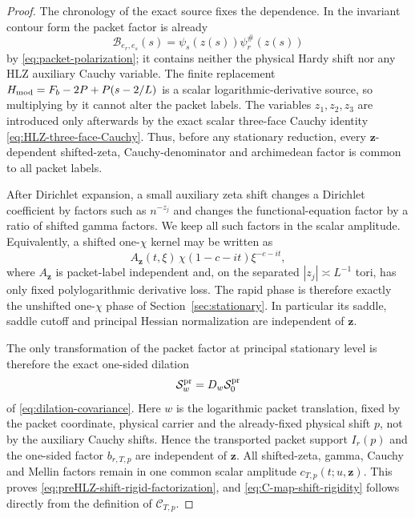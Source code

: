\begin{proof}
The chronology of the exact source fixes the dependence.  In the invariant
contour form the packet factor is already
\[
\mathcal B_{e_r,e_s}(s)=\psi_s(z(s))\psi_r^\#(z(s))
\]
by \eqref{eq:packet-polarization}; it contains neither the physical Hardy shift
nor any HLZ auxiliary Cauchy variable.  The finite replacement
$H_{\rm mod}=F_b-2P+P(s-2/L)$ is a scalar logarithmic-derivative source, so
multiplying by it cannot alter the packet labels.  The variables
$z_1,z_2,z_3$ are introduced only afterwards by the exact scalar three-face
Cauchy identity \eqref{eq:HLZ-three-face-Cauchy}.  Thus, before any stationary
reduction, every $\mathbf z$-dependent shifted-zeta, Cauchy-denominator and
archimedean factor is common to all packet labels.

After Dirichlet expansion, a small auxiliary zeta shift changes a Dirichlet
coefficient by factors such as $n^{-z_j}$ and changes the functional-equation
factor by a ratio of shifted gamma factors.  We keep all such factors in the
scalar amplitude.  Equivalently, a shifted one-$\chi$ kernel may be written as
\[
A_{\mathbf z}(t,\xi)\,
\chi(1-c-it)\xi^{-c-it},
\]
where $A_{\mathbf z}$ is packet-label independent and, on the separated
$|z_j|\asymp L^{-1}$ tori, has only fixed polylogarithmic derivative loss.  The
rapid phase is therefore exactly the unshifted one-$\chi$ phase of
Section~\ref{sec:stationary}.  In particular its saddle, saddle cutoff and
principal Hessian normalization are independent of $\mathbf z$.

The only transformation of the packet factor at principal stationary level is
therefore the exact one-sided dilation
\[
\mathcal S_w^{\rm pr}=D_w\mathcal S_0^{\rm pr}
\]
of \eqref{eq:dilation-covariance}.  Here $w$ is the logarithmic packet translation, fixed by the packet coordinate,
physical carrier and the already-fixed physical shift $p$, not by the auxiliary
Cauchy shifts.  Hence the transported packet support $I_r(p)$ and the one-sided
factor $b_{r,T,p}$ are independent of $\mathbf z$.  All shifted-zeta, gamma,
Cauchy and Mellin factors remain in one common scalar amplitude
$c_{T,p}(t;u,\mathbf z)$.  This proves
\eqref{eq:preHLZ-shift-rigid-factorization}, and
\eqref{eq:C-map-shift-rigidity} follows directly from the definition of
$\mathscr C_{T,p}$.
\end{proof}

